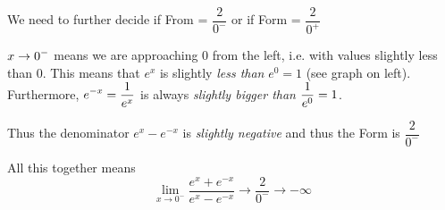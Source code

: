 \documentclass[10pt]{article}
\begin{document}
{{{{\item We need to further decide if From = $\dfrac{2}{0^-}$ or if Form =  $\dfrac{2}{0^+}$
\item $\displaystyle {x\to0^-} $ means we are approaching $0$ from the left, i.e. with values slightly less than $0$.  This means that $e^x$ is slightly {\em less than} $e^0=1$ (see graph on left).  Furthermore, $\displaystyle e^{-x}=\frac{1}{e^x}$ is always  {\em slightly bigger than} $\displaystyle \frac{1}{e^0}=1$. 
\item Thus the denominator $e^x-e^{-x}$ is {\em slightly negative} and thus the Form is $\dfrac{2}{0^-}$
\item All this together means $$\lim_{x\to0^-} \frac{e^x+e^{-x}}{e^x-e^{-x}} \to\frac{2}{0^-}\to -\infty$$
}
}
 }
}
\end{document}
